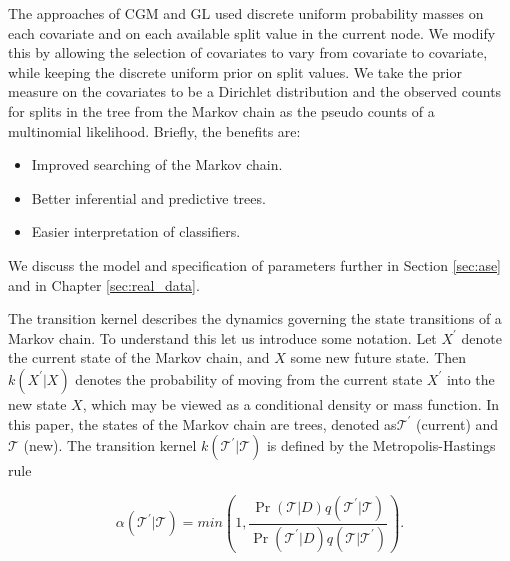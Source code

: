 The approaches of CGM and GL used discrete uniform probability masses on each covariate and on each available split value in the current node. We modify this by allowing the selection of covariates to vary from covariate to covariate, while keeping the discrete uniform prior on split values. We take the prior measure on the covariates to be a Dirichlet distribution and the observed counts for splits in the tree from the Markov chain as the pseudo counts of a multinomial likelihood.  Briefly, the benefits are:
\begin{itemize}
\item Improved searching of the Markov chain.
\item Better inferential and predictive trees. 
\item Easier interpretation of classifiers. 
\end{itemize}
We discuss the model and specification of parameters further in Section \ref{sec:ase} and in Chapter \ref{sec:real_data}.

The transition kernel describes the dynamics governing the state transitions of a Markov chain. To understand this let us introduce some notation. Let $X^\prime$ denote the current state of the Markov chain, and $X$ some new future state. Then $k(X^\prime\vert X)$ denotes the probability of moving from the current state $X^\prime$ into the new state $X$, which may be viewed as a conditional density or mass function. In this paper, the states of the Markov chain are trees, denoted as$ \mathcal{T}^\prime $ (current) and $ \mathcal{T} $ (new). The transition kernel $k(\mathcal{T}^\prime\vert\mathcal{T})$ is defined by the Metropolis-Hastings rule 

 \begin{equation}\label{eqn:MHrule}
  \alpha(\mathcal{T}^\prime\vert\mathcal{T})= 
  min\left(1,\frac{ \Pr(\mathcal{T}\vert D)q(\mathcal{T}^\prime\vert\mathcal{T})}{ \Pr(\mathcal{T}^\prime\vert D)q(\mathcal{T}\vert\mathcal{T}^\prime)}\right). 
  \end{equation} 
  
